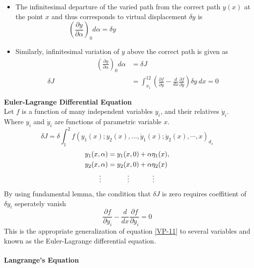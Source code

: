 	\begin{itemize}
		\item The infinitesimal departure of the varied path from the correct path $y(x)$ at the point $x$ and thus corresponds to virtual displacement $\delta y$ is
		$$\left( \frac{\partial y}{\partial\alpha}\right)_0 d\alpha=\delta y\hspace{5cm}$$
\item Similarly, infinitesimal variation of $y$ above the correct path is given as		
\begin{align*}
\hspace{3cm}\left( \frac{\partial y}{\partial\alpha}\right)_0 d\alpha&=\delta J\\
\delta J&=\int_{x_{1}}^{12}\left(\frac{\partial f}{\partial y}-\frac{d}{d x} \frac{\partial f}{\partial \dot{y}}\right)\delta y\ dx=0
\end{align*}
	\end{itemize}
\textbf{Euler-Lagrange Differential Equation}\\
Let $f$ is a function of many independent variables $y_i$, and their relatives $\dot{y}_i$. Where $y_i$ and $\dot{y}_i$ are functions of parametric variable $x$.
\begin{equation}
\delta J=\delta \int_{1}^{2} f\left(y_{1}(x) ; y_{2}(x), \ldots, \dot{y}_{1}(x) ; \dot{y}_{2}(x), \cdots, x\right)_{d_{x}}\label{VP-12}
\end{equation}
\begin{align*}
y_{1}(x, \alpha)&=y_{1}(x, 0)+\alpha \eta_{1}(x),\\
y_{2}(x, \alpha)&=y_{2}(x, 0)+\alpha \eta_{2}(x)\\
\vdots\quad&\hspace{1cm}\vdots\hspace{1.2cm}\vdots
\end{align*}
By using fundamental lemma, the condition that $\delta J$ is zero requires coeffitient of $\delta y_i$ seperately vanish
\begin{equation}
\frac{\partial f}{\partial y_{i}}-\frac{d}{d x} \frac{\partial f}{\partial \dot{y}_{i}}=0\label{VP-13}
\end{equation}
This is the appropriate generalization of equation \ref{VP-11} to several variables and known as the Euler-Lagrange differential equation.\\\\
\textbf{Langrange's Equation}
